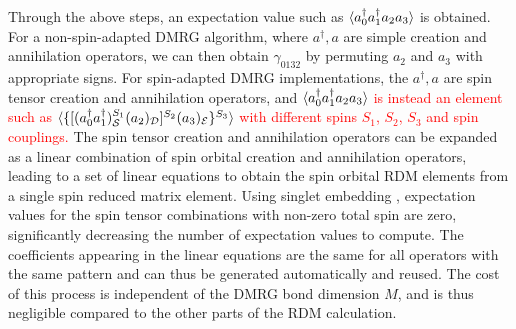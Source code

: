 Through the above steps, an expectation value such as $\braket{{a}^\dagger_0{a}^\dagger_1{a}_2{a}_3}$ is obtained. 
For a non-spin-adapted DMRG algorithm, where $a^\dag, a$ are simple creation and annihilation operators, 
we can then obtain $\gamma_{0132}$ by permuting $ {a}_2$ and ${a}_3$ with appropriate signs. For spin-adapted DMRG implementations, the $a^\dag, a$ 
are spin tensor creation and annihilation operators, and
$\braket{{a}^\dagger_0{a}^\dagger_1{a}_2{a}_3}$ \textcolor{red}{is instead an element such as
$\braket{\{[({a}^\dagger_0{a}^\dagger_1)^{S_1}_{\mathcal{S}}({a}_2)_{\mathcal{D}}]^{S_2}({a}_3)_{\mathcal{E}}\}^{S_3}}$ with different spins $S_1$, $S_2$, $S_3$ and spin couplings. }
The spin tensor creation and annihilation operators can be expanded as a linear combination of spin orbital creation
and annihilation operators, leading to a set of linear equations to obtain the spin orbital RDM elements from a single spin reduced matrix element. Using singlet embedding \cite{tatsuaki_interaction-round--face_2000, sharma_spin-adapted_2012}, expectation values for the spin tensor combinations with non-zero total spin are zero, significantly decreasing the number of 
expectation values to compute. The coefficients appearing in the linear equations are the same for all operators with the same pattern and can thus be generated 
automatically and reused. The cost of this process is independent of the DMRG bond dimension $M$, and is thus negligible compared to the other parts of the RDM calculation.

